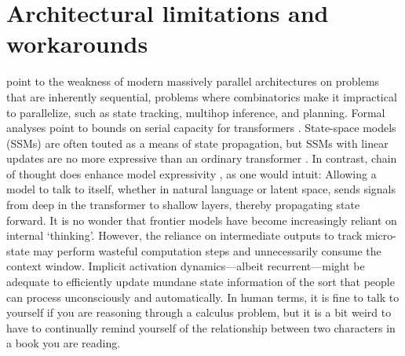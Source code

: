 \documentclass{article}
\begin{document}
\section{Architectural limitations and workarounds}

\citet{liu2026serialscalinghypothesis} point to the weakness of modern massively
parallel architectures on problems that are inherently sequential, problems where 
combinatorics make it impractical to parallelize, such as 
state tracking, multihop inference, and planning. Formal analyses point
to bounds on serial capacity for transformers 
\citep{merrill-sabharwal-2023-parallelism}. State-space models (SSMs) are often
touted as a means of state propagation, but SSMs with linear updates are
no more expressive than an ordinary transformer \citep{merrill2025illusion}.
In contrast, chain of thought does enhance model expressivity 
\citep{li2024chain,merrill2024cot}, as one would intuit:  Allowing a model
to talk to itself, whether in natural language or latent space, sends signals
from deep in the transformer to shallow layers, thereby propagating state forward.
It is no wonder that frontier models have become increasingly reliant on internal
`thinking'. However, the reliance on intermediate outputs to track
micro-state may perform wasteful computation steps and unnecessarily consume the context window. Implicit activation dynamics---albeit recurrent---might be adequate to 
efficiently update mundane state information of the sort that people can 
process unconsciously  and automatically. 
In human terms, it is fine to talk to yourself if you are reasoning through a 
calculus problem,  but it is a bit weird to have to continually remind yourself of 
the relationship between two characters in a book you are reading.
\end{document}

